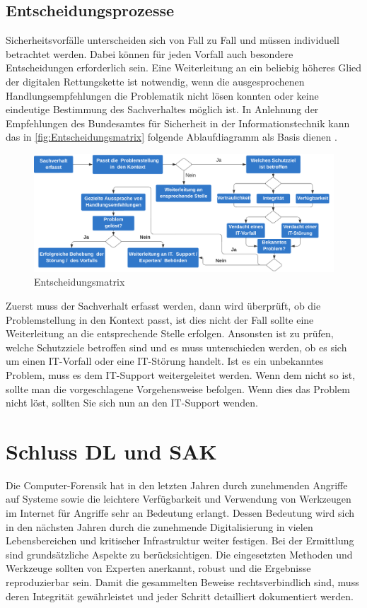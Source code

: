 \documentclass[12pt,DIV=14, version=first, BCOR=10mm,a4paper,twoside,parskip=half-,headsepline,headinclude]{scrartcl}
\begin{document}
	\subsection{Entscheidungsprozesse}
	Sicherheitsvorfälle unterscheiden sich von Fall zu Fall und müssen individuell betrachtet werden. Dabei können für jeden Vorfall auch besondere Entscheidungen erforderlich sein. Eine Weiterleitung an ein beliebig höheres Glied der digitalen Rettungskette ist notwendig, wenn die ausgesprochenen Handlungsempfehlungen die Problematik nicht lösen konnten oder keine eindeutige Bestimmung des Sachverhaltes möglich ist.
	In Anlehnung der Empfehlungen des Bundesamtes für Sicherheit in der Informationstechnik kann das in \autoref{fig:Entscheidungsmatrix} folgende Ablaufdiagramm als Basis dienen \cite[vgl. S. 53]{BSI_leitfaden}.

	\begin{figure}[h] 
		\centering
		\includegraphics[width=1.0\textwidth]{bilder/Entscheidungsmatrix2.png} 
		\caption{Entscheidungsmatrix}
		\label{fig:Entscheidungsmatrix}
	\end{figure}

    Zuerst muss der Sachverhalt erfasst werden, dann wird überprüft, ob die Problemstellung in den Kontext passt, ist dies nicht der Fall sollte eine Weiterleitung an die entsprechende Stelle erfolgen. Ansonsten ist zu prüfen, welche Schutzziele betroffen sind und es muss unterschieden werden, ob es sich um einen IT-Vorfall oder eine IT-Störung handelt. Ist es ein unbekanntes Problem, muss es dem IT-Support weitergeleitet werden. Wenn dem nicht so ist, sollte man die vorgeschlagene Vorgehensweise befolgen. Wenn dies das Problem nicht löst, sollten Sie sich nun an den IT-Support wenden.

\section {Schluss DL und SAK}
Die Computer-Forensik hat in den letzten Jahren durch zunehmenden Angriffe auf Systeme sowie die leichtere Verfügbarkeit und Verwendung von Werkzeugen im Internet für Angriffe sehr an Bedeutung erlangt. Dessen Bedeutung wird sich in den nächsten Jahren durch die zunehmende Digitalisierung in vielen Lebensbereichen und kritischer Infrastruktur weiter festigen.  
Bei der Ermittlung sind grundsätzliche Aspekte zu berücksichtigen. Die eingesetzten Methoden und Werkzeuge sollten von Experten anerkannt, robust und die Ergebnisse reproduzierbar sein. Damit die gesammelten Beweise rechtsverbindlich sind, muss deren Integrität gewährleistet und jeder Schritt detailliert dokumentiert werden.
\end{document}
